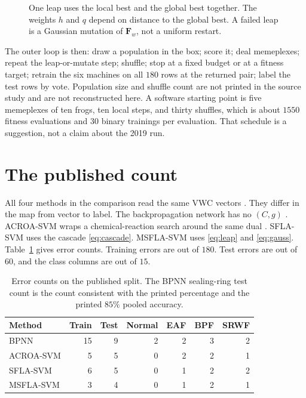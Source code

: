 \documentclass[11pt,a4paper]{article}
\newcommand{\vect}[1]{\mathbf{#1}}
\begin{document}
\begin{figure}[ht]
\centering
{}
\caption{One leap uses the local best and the global best together. The weights $h$ and $q$ depend on distance to the global best. A failed leap is a Gaussian mutation of $\vect{F}_{w}$, not a uniform restart.}
\label{fig:leap}
\end{figure}

The outer loop is then: draw a population in the box; score it; deal memeplexes; repeat the leap-or-mutate step; shuffle; stop at a fixed budget or at a fitness target; retrain the six machines on all $180$ rows at the returned pair; label the test rows by vote.
Population size and shuffle count are not printed in the source study and are not reconstructed here.
A software starting point is five memeplexes of ten frogs, ten local steps, and thirty shuffles, which is about $1550$ fitness evaluations and $30$ binary trainings per evaluation.
That schedule is a suggestion, not a claim about the 2019 run.

\section{The published count}

All four methods in the comparison read the same VWC vectors \cite{you2019}.
They differ in the map from vector to label.
The backpropagation network has no $(C,g)$ \cite{huang2009}.
ACROA-SVM wraps a chemical-reaction search around the same dual \cite{ao2014,alatas2011}.
SFLA-SVM uses the cascade \eqref{eq:cascade}.
MSFLA-SVM uses \eqref{eq:leap} and \eqref{eq:gauss}.
Table~\ref{tab:err} gives error counts.
Training errors are out of $180$.
Test errors are out of $60$, and the class columns are out of $15$.

\begin{table}[ht]
\centering
\caption{Error counts on the published split. The BPNN sealing-ring test count is the count consistent with the printed percentage and the printed $85\%$ pooled accuracy.}
\label{tab:err}
\begin{tabular}{lrrrrrr}
\toprule
Method & Train & Test & Normal & EAF & BPF & SRWF \\
\midrule
BPNN & 15 & 9 & 2 & 2 & 3 & 2 \\
ACROA-SVM & 5 & 5 & 0 & 2 & 2 & 1 \\
SFLA-SVM & 6 & 5 & 0 & 1 & 2 & 2 \\
MSFLA-SVM & 3 & 4 & 0 & 1 & 2 & 1 \\
\bottomrule
\end{tabular}
\end{table}
\end{document}
